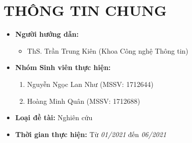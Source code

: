 \documentclass{article}[14pt]
\begin{document}
    \vspace{.5cm}
    
    \Large
    \section{THÔNG TIN CHUNG}
    \begin{itemize}[label = {}]
        
        \item \textbf{Người hướng dẫn:} 
        \begin{itemize}
            \item ThS. Trần Trung Kiên (Khoa Công nghệ Thông tin)
        \end{itemize}{}
    
        
        \item \textbf{Nhóm Sinh viên thực hiện:}
        
        \begin{enumerate}
        
            \item Nguyễn Ngọc Lan Như (MSSV: 1712644) 
            \item Hoàng Minh Quân (MSSV: 1712688)
        \end{enumerate}

        \item \textbf{Loại đề tài:} Nghiên cứu
        
        \item \textbf{Thời gian thực hiện:} Từ \textit{01/2021} đến \textit{06/2021}
        
        
    \end{itemize}
    
\end{document}
